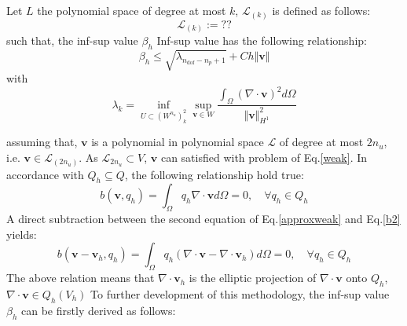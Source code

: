 \begin{thm}
    Let $L$ the polynomial space of degree at most $k$, $\mathcal L_{(k)}$ is defined as follows:
\begin{equation}
    \mathcal L_{(k)} := ??
\end{equation}
such that, the inf-sup value $\beta_h$
    Inf-sup value has the following relationship:
\begin{equation}
    \beta_h \le \sqrt{\lambda_{n_{\textrm{dof}}-n_p+1}} + C h \Vert \boldsymbol v \Vert
\end{equation}
with
\begin{equation}
    \lambda_k = \inf_{U \subset (W^{n_{u}})^2_k} \sup_{\boldsymbol v \in W} 
    \frac{\int_\Omega (\nabla \cdot \boldsymbol v)^2 d\Omega}{\Vert \boldsymbol v \Vert_{H^1}^2}
\end{equation}
\end{thm}
\begin{pf}

\end{pf}
assuming that, $\boldsymbol v$ is a polynomial in polynomial space $\mathcal L$ of degree at most $2n_u$, i.e. $\boldsymbol v \in \mathcal L_{(2n_u)}$. 
As $\mathcal L_{2n_u} \subset V$, $\boldsymbol v$ can satisfied with problem of Eq.\eqref{weak}.
In accordance with $Q_h \subseteq Q$, the following relationship hold true:
\begin{equation}\label{b2}
b(\boldsymbol v,q_h) = \int_{\Omega} q_h \nabla \cdot \boldsymbol v d\Omega = 0, \quad \forall q_h \in Q_h
\end{equation}
A direct subtraction between the second equation of Eq.\eqref{approxweak} and Eq.\eqref{b2} yields: 
\begin{equation}
b(\boldsymbol v - \boldsymbol v_h, q_h) = \int_{\Omega} q_h (\nabla\cdot \boldsymbol v - \nabla \cdot \boldsymbol v_h)d\Omega = 0, \quad \forall q_h \in Q_h
\end{equation}
The above relation means that $\nabla \cdot \boldsymbol v_h$ is the elliptic projection of $\nabla \cdot \boldsymbol v$ onto $Q_h$, 
$\nabla \cdot \boldsymbol v \in Q_h(V_h)$
To further development of this methodology, the inf-sup value $\beta_h$ can be firstly derived as follows:
